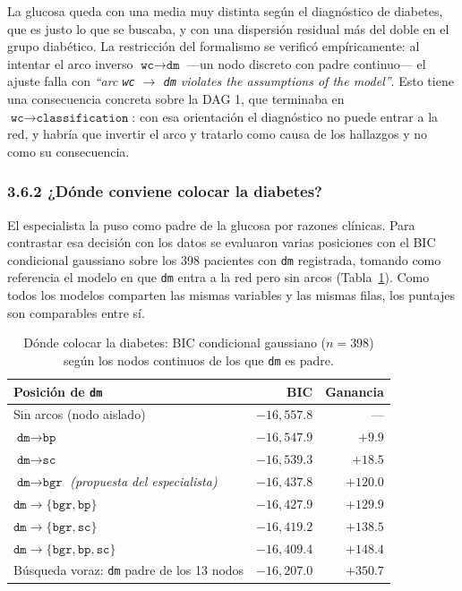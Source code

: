 \documentclass[11pt, a4paper]{article}
\begin{document}
La glucosa queda con una media muy distinta según el diagnóstico de diabetes, que es justo lo que
se buscaba, y con una dispersión residual más del doble en el grupo diabético. La restricción del
formalismo se verificó empíricamente: al intentar el arco inverso
$\texttt{wc} \rightarrow \texttt{dm}$ —un nodo discreto con padre continuo— el ajuste falla con
\textit{``arc \texttt{wc} $\rightarrow$ \texttt{dm} violates the assumptions of the model''}. Esto
tiene una consecuencia concreta sobre la DAG 1, que terminaba en
$\texttt{wc} \rightarrow \texttt{classification}$: con esa orientación el diagnóstico no puede
entrar a la red, y habría que invertir el arco y tratarlo como causa de los hallazgos y no como su
consecuencia.

\subsubsection*{3.6.2 ¿Dónde conviene colocar la diabetes?}

El especialista la puso como padre de la glucosa por razones clínicas. Para contrastar esa
decisión con los datos se evaluaron varias posiciones con el BIC condicional gaussiano sobre los
398 pacientes con \texttt{dm} registrada, tomando como referencia el modelo en que \texttt{dm}
entra a la red pero sin arcos (Tabla~\ref{tab:dm}). Como todos los modelos comparten las mismas
variables y las mismas filas, los puntajes son comparables entre sí.

\begin{table}[H]
\centering
\caption{Dónde colocar la diabetes: BIC condicional gaussiano ($n = 398$) según los nodos
continuos de los que \texttt{dm} es padre.}
\label{tab:dm}
\small
\renewcommand{\arraystretch}{1.12}
\begin{tabular}{l r r}
\toprule
\textbf{Posición de \texttt{dm}} & \textbf{BIC} & \textbf{Ganancia} \\
\midrule
Sin arcos (nodo aislado)                                        & $-16{,}557.8$ & --- \\
$\texttt{dm} \rightarrow \texttt{bp}$                           & $-16{,}547.9$ & $+9.9$   \\
$\texttt{dm} \rightarrow \texttt{sc}$                           & $-16{,}539.3$ & $+18.5$  \\
$\texttt{dm} \rightarrow \texttt{bgr}$ \textit{(propuesta del especialista)} & $-16{,}437.8$ & $+120.0$ \\
$\texttt{dm} \rightarrow \{\texttt{bgr},\texttt{bp}\}$          & $-16{,}427.9$ & $+129.9$ \\
$\texttt{dm} \rightarrow \{\texttt{bgr},\texttt{sc}\}$          & $-16{,}419.2$ & $+138.5$ \\
$\texttt{dm} \rightarrow \{\texttt{bgr},\texttt{bp},\texttt{sc}\}$ & $-16{,}409.4$ & $+148.4$ \\
Búsqueda voraz: \texttt{dm} padre de los 13 nodos               & $-16{,}207.0$ & $+350.7$ \\
\bottomrule
\end{tabular}
\end{table}
\end{document}
